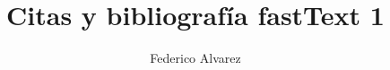 \documentclass[authoryear,a4paper, 12pt]{scrartcl}
\title{Citas y bibliografía fastText 1}
\author{Federico Alvarez}
\begin{document}
\maketitle

\citep{AlmeidaXexeo}\\
\citep{manning2008}\\
\citep{axler15}\\
\citet{firth57}\\
\citep{dumais1988}\\
\citep{bengio2003neural}\\
\citep{pennington2014glove}\\
\citet{mikolov2013}\\
\citep{joulin2016bag, bojanowski16}\\
\citet{bhattacharjee2017}



\end{document}
